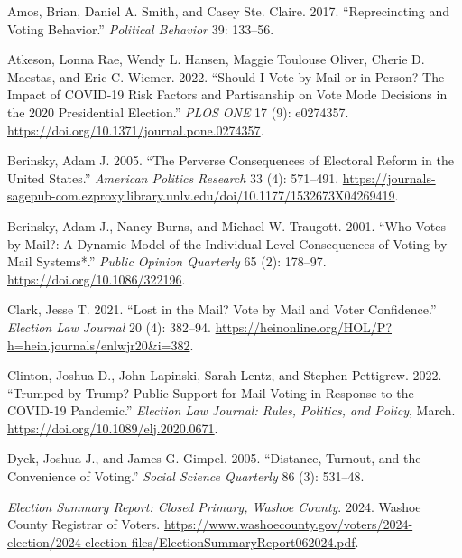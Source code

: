 \documentclass[12pt]{article}
\newlength{\cslhangindent}
\newlength{\cslentryspacingunit} %
\newenvironment{CSLReferences}[2] %
 {%
  \setlength{\parindent}{0pt}
  \ifodd #1
  \let\oldpar\par
  \def\par{\hangindent=\cslhangindent\oldpar}
  \fi
  \setlength{\parskip}{#2\cslentryspacingunit}
 }%
 {}
\begin{document}
\hypertarget{refs}{}
\begin{CSLReferences}{1}{0}
\leavevmode{}%
Amos, Brian, Daniel A. Smith, and Casey Ste. Claire. 2017. {``Reprecincting and Voting Behavior.''} \emph{Political Behavior} 39: 133--56.

\leavevmode{}%
Atkeson, Lonna Rae, Wendy L. Hansen, Maggie Toulouse Oliver, Cherie D. Maestas, and Eric C. Wiemer. 2022. {``Should I Vote-by-Mail or in Person? The Impact of COVID-19 Risk Factors and Partisanship on Vote Mode Decisions in the 2020 Presidential Election.''} \emph{PLOS ONE} 17 (9): e0274357. \url{https://doi.org/10.1371/journal.pone.0274357}.

\leavevmode{}%
Berinsky, Adam J. 2005. {``The Perverse Consequences of Electoral Reform in the United States.''} \emph{American Politics Research} 33 (4): 571--491. \url{https://journals-sagepub-com.ezproxy.library.unlv.edu/doi/10.1177/1532673X04269419}.

\leavevmode{}%
Berinsky, Adam J., Nancy Burns, and Michael W. Traugott. 2001. {``Who Votes by Mail?: A Dynamic Model of the Individual-Level Consequences of Voting-by-Mail Systems*.''} \emph{Public Opinion Quarterly} 65 (2): 178--97. \url{https://doi.org/10.1086/322196}.

\leavevmode{}%
Clark, Jesse T. 2021. {``Lost in the Mail? Vote by Mail and Voter Confidence.''} \emph{Election Law Journal} 20 (4): 382--94. \url{https://heinonline.org/HOL/P?h=hein.journals/enlwjr20&i=382}.

\leavevmode{}%
Clinton, Joshua D., John Lapinski, Sarah Lentz, and Stephen Pettigrew. 2022. {``Trumped by Trump? Public Support for Mail Voting in Response to the COVID-19 Pandemic.''} \emph{Election Law Journal: Rules, Politics, and Policy}, March. \url{https://doi.org/10.1089/elj.2020.0671}.

\leavevmode{}%
Dyck, Joshua J., and James G. Gimpel. 2005. {``Distance, Turnout, and the Convenience of Voting.''} \emph{Social Science Quarterly} 86 (3): 531--48.

\leavevmode{}%
\emph{Election Summary Report: Closed Primary, Washoe County}. 2024. Washoe County Registrar of Voters. \url{https://www.washoecounty.gov/voters/2024-election/2024-election-files/ElectionSummaryReport062024.pdf}.


\end{CSLReferences}
\end{document}
